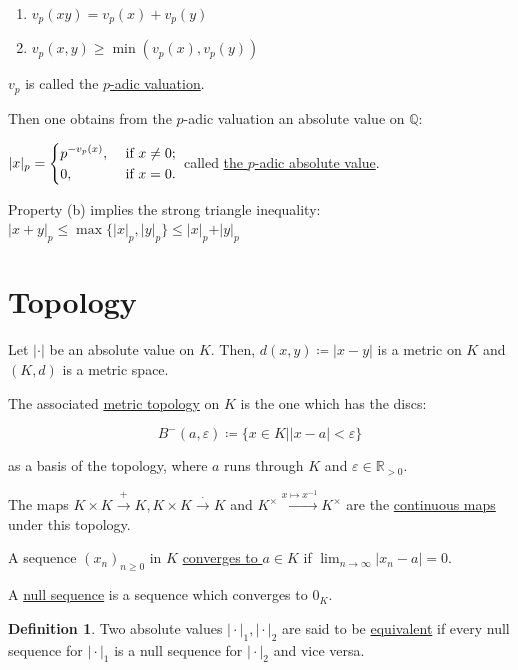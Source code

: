 \documentclass[openany]{amsbook}
\numberwithin{section}{chapter}
\theoremstyle{definition}
\newtheorem*{definition}{Definition}
\begin{document}
\begin{enumerate}[label=\arabic*)]
    \begin{enumerate}[label=\alph*)]
        \item \(v_p(xy) = v_p(x) + v_p(y)\) 
        \item \(v_p(x,y) \geq \min (v_p(x),v_p(y))\)  
    \end{enumerate} 

    \(v_p\) is called the \underline{\(p\)-adic valuation}. 

    Then one obtains from the \(p\)-adic valuation an absolute value on \(\mathbb{Q}:\)
    
    \(\vert x \vert _ p = \begin{dcases}
        p^{-v_p(x)}, &\text{ if } x \neq 0 ;\\
        0, &\text{ if } x = 0.
    \end{dcases}\) called \underline{the \(p\)-adic absolute value}.

    Property (b) implies the strong triangle inequality: \(\vert x+y \vert _ p \leq \max \{ \vert x \vert _ p, \vert y \vert _p \} \leq \vert x \vert _p + \vert y \vert _ p\) 

\end{enumerate}

\section{Topology}

Let \(\vert \cdot \vert \) be an absolute value on \(K\). Then, \(d(x,y)\coloneqq \vert x-y \vert\) is a metric on \(K\) and \((K,d)\) is a metric space.

The associated \underline{metric topology} on \(K\) is the one which has the discs:

\[
    B^-(a,\varepsilon)\coloneqq \{ x \in K \mid \vert x - a \vert < \varepsilon \} 
\]

as a basis of the topology, where \(a\) runs through \(K\) and \(\varepsilon \in \mathbb{R}_{>0}\).

The maps \(K \times K \overset{+}{\to} K, K \times K \overset{\cdot}{\to} K\) and \(K^\times \overset{x \mapsto x ^{-1}}{\longrightarrow} K^\times\) are the \underline{continuous maps} under this topology.

A sequence \((x_n)_{n \geq 0}\) in \(K\) \underline{converges to \(a\in K\)} if \(\lim_{n \to \infty} \vert x_n - a \vert = 0\).

A \underline{null sequence} is a sequence which converges to \(0_K\).

\begin{definition}
    Two absolute values \(\vert \cdot \vert _1, \vert \cdot \vert _2\) are said to be \underline{equivalent} if every null sequence for \(\vert \cdot \vert_1\) is a null sequence for \(\vert \cdot \vert_2\) and vice versa.
\end{definition}
\end{document}
